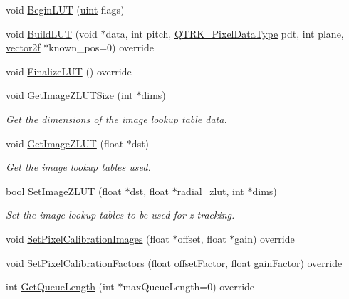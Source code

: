 \begin{DoxyCompactItemize}
\item 
void \hyperlink{class_queued_c_p_u_tracker_af4b7390a38d56cc45670a60586e20051}{Begin\+L\+UT} (\hyperlink{std__incl_8h_a91ad9478d81a7aaf2593e8d9c3d06a14}{uint} flags)
\item 
void \hyperlink{class_queued_c_p_u_tracker_ac73750c7446b69b070ab24742b02660f}{Build\+L\+UT} (void $\ast$data, int pitch, \hyperlink{qtrk__c__api_8h_aad82367b3ea592a142bb50a2fb538b0b}{Q\+T\+R\+K\+\_\+\+Pixel\+Data\+Type} pdt, int plane, \hyperlink{std__incl_8h_aba974726076ec2d63a67114c536d123e}{vector2f} $\ast$known\+\_\+pos=0) override
\item 
void \hyperlink{class_queued_c_p_u_tracker_a9d94101b69e1f514473bfedc012ec785}{Finalize\+L\+UT} () override
\item 
void \hyperlink{class_queued_c_p_u_tracker_a399b87fd1542b05fc9e9c80c1dd6b664}{Get\+Image\+Z\+L\+U\+T\+Size} (int $\ast$dims)
\begin{DoxyCompactList}\small\item\em Get the dimensions of the image lookup table data. \end{DoxyCompactList}\item 
void \hyperlink{class_queued_c_p_u_tracker_a53b0d922963c771e804fb624f7d39821}{Get\+Image\+Z\+L\+UT} (float $\ast$dst)
\begin{DoxyCompactList}\small\item\em Get the image lookup tables used. \end{DoxyCompactList}\item 
bool \hyperlink{class_queued_c_p_u_tracker_a151a19c5ba686c62d1fc47fa0eb1ef95}{Set\+Image\+Z\+L\+UT} (float $\ast$dst, float $\ast$radial\+\_\+zlut, int $\ast$dims)
\begin{DoxyCompactList}\small\item\em Set the image lookup tables to be used for z tracking. \end{DoxyCompactList}\item 
void \hyperlink{class_queued_c_p_u_tracker_a7574f92390c674ddcbb35cefc6e87da5}{Set\+Pixel\+Calibration\+Images} (float $\ast$offset, float $\ast$gain) override
\item 
void \hyperlink{class_queued_c_p_u_tracker_a94903982ee31eced25b4640b12a4bc56}{Set\+Pixel\+Calibration\+Factors} (float offset\+Factor, float gain\+Factor) override
\item 
int \hyperlink{class_queued_c_p_u_tracker_a7e1a888cfcc2eb97e059d6711ddfc8af}{Get\+Queue\+Length} (int $\ast$max\+Queue\+Length=0) override
\item 

\end{DoxyCompactItemize}
